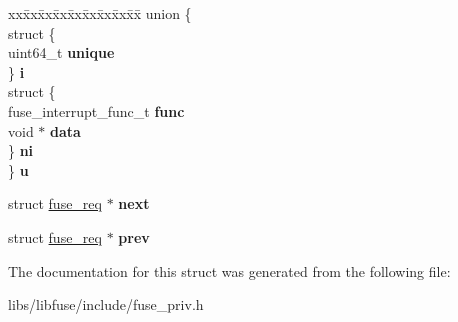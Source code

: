 \begin{DoxyCompactItemize}
\item 
\begin{tabbing}
xx\=xx\=xx\=xx\=xx\=xx\=xx\=xx\=xx\=\kill
union \{\\
\>struct \{\\
\>\>uint64\_t {\bfseries unique}\\
\>\} {\bfseries i}\\
\>struct \{\\
\>\>fuse\_interrupt\_func\_t {\bfseries func}\\
\>\>void $\ast$ {\bfseries data}\\
\>\} {\bfseries ni}\\
\} {\bfseries u}\hypertarget{structfuse__req_a0a68adab6d65c39c8cabf9b218cee348}{}\label{structfuse__req_a0a68adab6d65c39c8cabf9b218cee348}
\\

\end{tabbing}\item 
struct \hyperlink{structfuse__req}{fuse\+\_\+req} $\ast$ {\bfseries next}\hypertarget{structfuse__req_a03d74df4670c92cabcd7ed0353d0d7f8}{}\label{structfuse__req_a03d74df4670c92cabcd7ed0353d0d7f8}

\item 
struct \hyperlink{structfuse__req}{fuse\+\_\+req} $\ast$ {\bfseries prev}\hypertarget{structfuse__req_a5a946d59a8a04a34b13de36e76cfeebb}{}\label{structfuse__req_a5a946d59a8a04a34b13de36e76cfeebb}

\end{DoxyCompactItemize}


The documentation for this struct was generated from the following file\+:\begin{DoxyCompactItemize}
\item 
libs/libfuse/include/fuse\+\_\+priv.\+h\end{DoxyCompactItemize}
